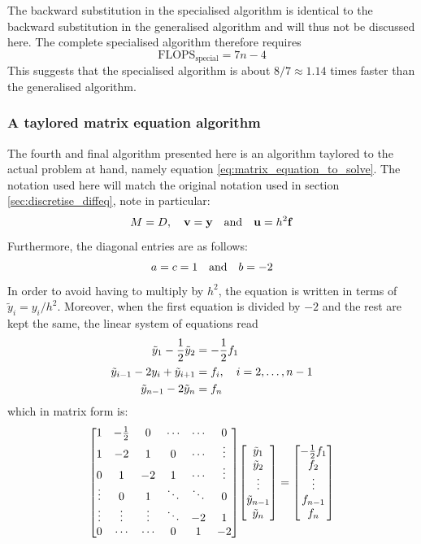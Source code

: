 \documentclass[reprint,english]{revtex4-1}
\begin{document}
The backward substitution in the specialised algorithm is identical to the backward substitution in the generalised algorithm and will thus not be discussed here. The complete specialised algorithm therefore requires
\begin{equation}
\text{FLOPS}_{\text{special}}=7n-4
\end{equation}
This suggests that the specialised algorithm is about \(8/7\approx1.14\) times faster than the generalised algorithm.
\newpage
\subsubsection{A taylored matrix equation algorithm}
The fourth and final algorithm presented here is an algorithm taylored to the actual problem at hand, namely equation \eqref{eq:matrix_equation_to_solve}. The notation used here will match the original notation used in section \ref{sec:discretise_diffeq}, note in particular:
\[M=D\qc\vb{v}=\vb{y}\qand\vb{u}=h^2\vb{f}\]
Furthermore, the diagonal entries are as follows:
\[a=c=1\qand b=-2\]
In order to avoid having to multiply by \(h^2\), the equation is written in terms of \(\tilde{y}_i=y_i/h^2\). Moreover, when the first equation is divided by \(-2\) and the rest are kept the same, the linear system of equations read
\begin{align*}
\tilde{y}_1-\frac{1}{2}\tilde{y}_2&=-\frac{1}{2}f_1\\
\tilde{y}_{i-1}-2y_i+\tilde{y}_{i+1}&=f_i\qc i=2,\ldots,n-1\\
\tilde{y}_{n-1}-2\tilde{y}_n&=f_n
\end{align*}
which in matrix form is:
\[\mqty[1 & -\frac{1}{2} & 0 & \cdots & \cdots & 0 \\
1 & -2 & 1 & 0 & \cdots & \vdots \\
0 & 1 & -2 & 1 & \cdots & \vdots \\
\vdots & 0 & 1 & \ddots & \ddots & 0 \\
\vdots & \vdots & \vdots & \ddots & -2 & 1 \\
0 & \cdots & \cdots & 0 & 1 & -2]\mqty[\tilde{y}_1 \\ \tilde{y}_2 \\ \vdots \\ \tilde{y}_{n-1} \\ \tilde{y}_n]=\mqty[-\frac{1}{2}f_1 \\ f_2 \\ \vdots \\ f_{n-1} \\ f_n]\]
\end{document}
